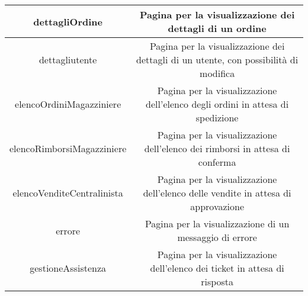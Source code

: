 \documentclass[12pt,a4paper]{article}
\begin{document}
\begin{center}
\begin{tabular}{|c|c|}
dettagliOrdine & \begin{minipage}{10cm} \vspace{5pt}
Pagina per la visualizzazione dei dettagli di un ordine \vspace{5pt}
\end{minipage} \\ \hline

dettagliutente & \begin{minipage}{10cm} \vspace{5pt}
Pagina per la visualizzazione dei dettagli di un utente, con possibilità di modifica \vspace{5pt}
\end{minipage} \\ \hline

elencoOrdiniMagazziniere & \begin{minipage}{10cm} \vspace{5pt}
Pagina per la visualizzazione dell'elenco degli ordini in attesa di spedizione \vspace{5pt}
\end{minipage} \\ \hline

elencoRimborsiMagazziniere & \begin{minipage}{10cm} \vspace{5pt}
Pagina per la visualizzazione dell'elenco dei rimborsi in attesa di conferma \vspace{5pt}
\end{minipage} \\ \hline

elencoVenditeCentralinista & \begin{minipage}{10cm} \vspace{5pt}
Pagina per la visualizzazione dell'elenco delle vendite in attesa di approvazione \vspace{5pt}
\end{minipage} \\ \hline

errore & \begin{minipage}{10cm} \vspace{5pt}
Pagina per la visualizzazione di un messaggio di errore \vspace{5pt}
\end{minipage} \\ \hline

gestioneAssistenza & \begin{minipage}{10cm} \vspace{5pt}
Pagina per la visualizzazione dell'elenco dei ticket in attesa di risposta\vspace{5pt}
\end{minipage} \\ \hline


\end{tabular}
\end{center}
\end{document}
